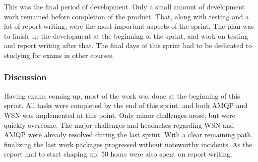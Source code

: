 This was the final period of development. Only a small amount of development work remained before completion of the product. That, along with testing and a lot of report writing, were the most important aspects of the sprint. The plan was to finish up the development at the beginning of the sprint, and work on testing and report writing after that. The final days of this sprint had to be dedicated to studying for exams in other courses.

\subsubsection{Discussion}
\label{subsec:project_lifecycle-development-sprint_6-discussion}

Having exams coming up, most of the work was done at the beginning of this sprint. All tasks were completed by the end of this sprint, and both AMQP and WSN was implemented at this point. Only minor challenges arose, but were quickly overcome. The major challenges and headaches regarding WSN and AMQP were already resolved during the last sprint. With a clear remaining path, finalizing the last work packages progressed without noteworthy incidents. As the report had to start shaping up, 50 hours were also spent on report writing.

\clearpage


